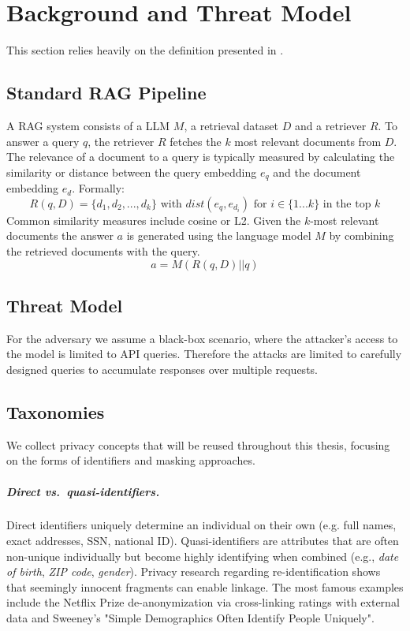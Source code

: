 \chapter{Background and Threat Model}\label{chapter:background}
This section relies heavily on the definition presented in \cite{goodAndBad}.

\section{Standard RAG Pipeline}
A \ac{RAG} system consists of a \ac{LLM} $M$, a retrieval dataset $D$ and a retriever $R$. To answer a query $q$, the retriever $R$ fetches the $k$ most relevant documents from $D$. The relevance of a document to a query is typically measured by calculating the similarity or distance between the query embedding $e_q$ and the document embedding $e_d$. Formally:
\[R(q,D) = \{d_1,d_2,..., d_k\} \mbox{ with } dist(e_q, e_{d_i}) \mbox{ for } i \in \{1...k\} \mbox{ in the top } k\]
Common similarity measures include cosine or L2. Given the $k$-most relevant documents the answer $a$ is generated using the language model $M$ by combining the retrieved documents with the query. $$a = M(R(q,D)\vert\vert q)$$

\section{Threat Model}\label{background-sec:threat-model}
For the adversary we assume a black-box scenario, where the attacker's access to the model is limited to API queries. Therefore the attacks are limited to carefully designed queries to accumulate responses over multiple requests.

\section{Taxonomies}
We collect privacy concepts that will be reused throughout this thesis, focusing on the forms of identifiers and masking approaches.

\paragraph{Direct vs.\ quasi-identifiers.}
Direct identifiers uniquely determine an individual on their own (e.g. full names, exact addresses, SSN, national ID). Quasi-identifiers are attributes that are often non-unique individually but become highly identifying when combined (e.g., \textit{date of birth}, \textit{ZIP code}, \textit{gender}). Privacy research regarding re-identification shows that seemingly innocent fragments can enable linkage. The most famous examples include the Netflix Prize de-anonymization via cross-linking ratings with external data and Sweeney's "Simple Demographics Often Identify People Uniquely". \cite{netflixDeAnon, simpleDemographic} 


